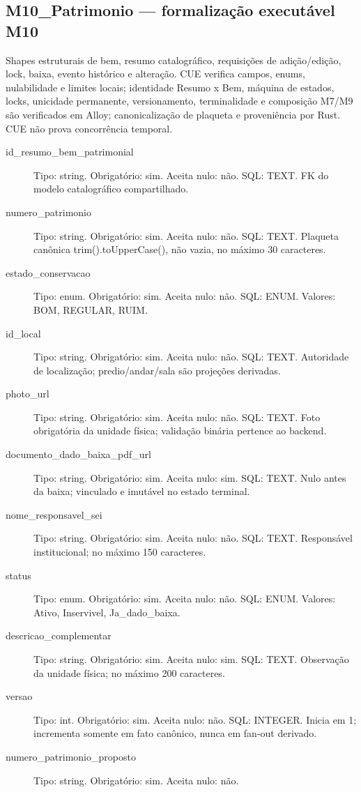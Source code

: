\subsection*{M10\_Patrimonio --- formalização executável M10}
Shapes estruturais de bem, resumo catalográfico, requisições de adição/edição, lock, baixa, evento histórico e alteração. CUE verifica campos, enums, nulabilidade e limites locais; identidade Resumo x Bem, máquina de estados, locks, unicidade permanente, versionamento, terminalidade e composição M7/M9 são verificados em Alloy; canonicalização de plaqueta e proveniência por Rust. CUE não prova concorrência temporal.
\begin{description}
\item[id\_resumo\_bem\_patrimonial] Tipo: string. Obrigatório: sim. Aceita nulo: não.
SQL: TEXT.
FK do modelo catalográfico compartilhado.
\item[numero\_patrimonio] Tipo: string. Obrigatório: sim. Aceita nulo: não.
SQL: TEXT.
Plaqueta canônica trim().toUpperCase(), não vazia, no máximo 30 caracteres.
\item[estado\_conservacao] Tipo: enum. Obrigatório: sim. Aceita nulo: não.
SQL: ENUM.
Valores: BOM, REGULAR, RUIM.
\item[id\_local] Tipo: string. Obrigatório: sim. Aceita nulo: não.
SQL: TEXT.
Autoridade de localização; predio/andar/sala são projeções derivadas.
\item[photo\_url] Tipo: string. Obrigatório: sim. Aceita nulo: não.
SQL: TEXT.
Foto obrigatória da unidade física; validação binária pertence ao backend.
\item[documento\_dado\_baixa\_pdf\_url] Tipo: string. Obrigatório: sim. Aceita nulo: sim.
SQL: TEXT.
Nulo antes da baixa; vinculado e imutável no estado terminal.
\item[nome\_responsavel\_sei] Tipo: string. Obrigatório: sim. Aceita nulo: não.
SQL: TEXT.
Responsável institucional; no máximo 150 caracteres.
\item[status] Tipo: enum. Obrigatório: sim. Aceita nulo: não.
SQL: ENUM.
Valores: Ativo, Inservivel, Ja\_dado\_baixa.
\item[descricao\_complementar] Tipo: string. Obrigatório: sim. Aceita nulo: sim.
SQL: TEXT.
Observação da unidade física; no máximo 200 caracteres.
\item[versao] Tipo: int. Obrigatório: sim. Aceita nulo: não.
SQL: INTEGER.
Inicia em 1; incrementa somente em fato canônico, nunca em fan-out derivado.
\item[numero\_patrimonio\_proposto] Tipo: string. Obrigatório: sim. Aceita nulo: não.

\end{description}
